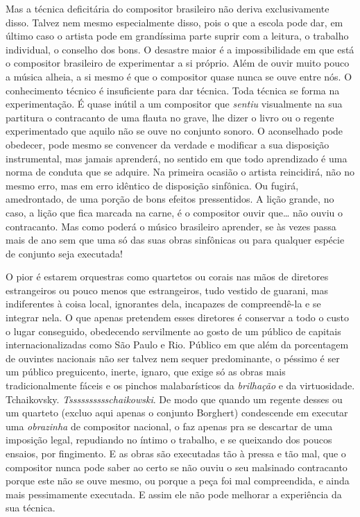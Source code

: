 Mas a técnica deficitária do compositor brasileiro não deriva
exclusivamente disso. Talvez nem mesmo especialmente disso, pois o que a
escola pode dar, em último caso o artista pode em grandíssima parte
suprir com a leitura, o trabalho individual, o conselho dos bons. O
desastre maior é a impossibilidade em que está o compositor brasileiro
de experimentar a si próprio. Além de ouvir muito pouco a música alheia,
a si mesmo é que o compositor quase nunca se ouve entre nós. O
conhecimento técnico é insuficiente para dar técnica. Toda técnica se
forma na experimentação. É quase inútil a um compositor que \textit{sentiu}
visualmente na sua partitura o contracanto de uma flauta no grave, lhe
dizer o livro ou o regente experimentado que aquilo não se ouve no
conjunto sonoro. O aconselhado pode obedecer, pode mesmo se convencer da
verdade e modificar a sua disposição instrumental, mas jamais aprenderá,
no sentido em que todo aprendizado é uma norma de conduta que se
adquire. Na primeira ocasião o artista reincidirá, não no mesmo erro,
mas em erro idêntico de disposição sinfônica. Ou fugirá, amedrontado, de
uma porção de bons efeitos pressentidos. A lição grande, no caso, a
lição que fica marcada na carne, é o compositor ouvir que\ldots{} não ouviu o
contracanto. Mas como poderá o músico brasileiro aprender, se às vezes
passa mais de ano sem que uma só das suas obras sinfônicas ou para
qualquer espécie de conjunto seja executada!

O pior é estarem orquestras como quartetos ou corais nas mãos de
diretores estrangeiros ou pouco menos que estrangeiros, tudo vestido de
guarani, mas indiferentes à coisa local, ignorantes dela, incapazes de
compreendê-la e se integrar nela. O que apenas pretendem esses diretores
é conservar a todo o custo o lugar conseguido, obedecendo servilmente ao
gosto de um público de capitais internacionalizadas como São Paulo e
Rio. Público em que além da porcentagem de ouvintes nacionais não ser
talvez nem sequer predominante, o péssimo é ser um público preguicento,
inerte, ignaro, que exige só as obras mais tradicionalmente fáceis e os
pinchos malabarísticos da \textit{brilhação} e da virtuosidade. Tchaikovsky.
\textit{Tsssssssssschaikowski}. De modo que quando um regente desses ou um
quarteto (excluo aqui apenas o conjunto Borghert) condescende em
executar uma \textit{obrazinha} de compositor nacional, o faz apenas pra se
descartar de uma imposição legal, repudiando no íntimo o trabalho, e se
queixando dos poucos ensaios, por fingimento. E as obras são executadas
tão à pressa e tão mal, que o compositor nunca pode saber ao certo se
não ouviu o seu malsinado contracanto porque este não se ouve mesmo, ou
porque a peça foi mal compreendida, e ainda mais pessimamente executada.
E assim ele não pode melhorar a experiência da sua técnica.

